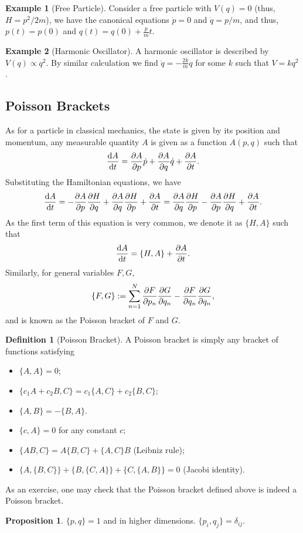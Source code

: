 \documentclass[]{article}
\theoremstyle{definition}
\theoremstyle{definition}
\newtheorem{definition}{Definition}[section]
\newtheorem{proposition}{Proposition}[section]
\newtheorem{example}{Example}[section]
\begin{document}
\begin{example}[Free Particle]
  Consider a free particle with \(V(q) = 0\) (thus, \(H = p^2 / 2m\)), we have 
  the canonical equations \(\dot p = 0\) and \(\dot q = p / m\), and thus, 
  \(p(t) = p(0)\) and \(q(t) = q(0) + \frac{p}{m} t\).
\end{example}

\begin{example}[Harmonic Oscillator]
  A harmonic oscillator is described by \(V(q) \propto q^2\). By similar calculation 
  we find \(\ddot q = - \frac{2k}{m} q\) for some \(k\) such that \(V = k q^2\).
\end{example}

\subsection{Poisson Brackets}

As for a particle in classical mechanics, the state is given by its position and 
momentum, any measurable quantity \(A\) is given as a function \(A(p, q)\) 
such that 
\[\dv{A}{t} = \pdv{A}{p}\dot p + \pdv{A}{q} \dot q + \pdv{A}{t}.\]
Substituting the Hamiltonian equations, we have 
\[\dv{A}{t} = - \pdv{A}{p} \pdv{H}{q} + \pdv{A}{q} \pdv{H}{p} + \pdv{A}{t}
  = \pdv{A}{q} \pdv{H}{p} - \pdv{A}{p} \pdv{H}{q} + \pdv{A}{t}.\]
As the first term of this equation is very common, we denote it as \(\{H, A\}\) 
such that 
\[\dv{A}{t} = \{H, A\} + \pdv{A}{t}.\] 
Similarly, for general variables \(F, G\), 
\[\{F, G\} := \sum_{n = 1}^N \pdv{F}{p_n}\pdv{G}{q_n} - \pdv{F}{q_n}\pdv{G}{q_n},\]
and is known as the Poisson bracket of \(F\) and \(G\).

\begin{definition}[Poisson Bracket]
  A Poisson bracket is simply any bracket of functions satisfying 
  \begin{itemize}
    \item \(\{A, A\} = 0\);
    \item \(\{c_1 A + c_2 B, C\} = c_1\{A, C\} + c_2\{B, C\}\);
    \item \(\{A, B\} = -\{B, A\}\).
    \item \(\{c, A\} = 0\) for any constant \(c\);
    \item \(\{AB, C\} = A\{B, C\} + \{A, C\}B\) (Leibniz rule);
    \item \(\{A, \{B, C\}\} + \{B, \{C, A\}\} + \{C, \{A, B\}\} = 0\) (Jacobi identity).
  \end{itemize}
\end{definition}
As an exercise, one may check that the Poisson bracket defined above is indeed 
a Poisson bracket.
\begin{proposition}
  \(\{p, q\} = 1\) and in higher dimensions. \(\{p_i, q_j\} = \delta_{ij}\).
\end{proposition}
\end{document}
